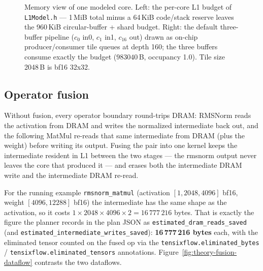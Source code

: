 \begin{figure}[t]
  \caption{Memory view of one modeled core. Left: the per-core L1 budget of
    \texttt{L1Model.h} --- 1\,MiB total minus a 64\,KiB code/stack reserve leaves
    the 960\,KiB circular-buffer + shard budget. Right: the default three-buffer
    pipeline ($c_0$ in0, $c_1$ in1, $c_{16}$ out) drawn as on-chip
    producer/consumer tile queues at depth 160; the three buffers consume exactly
    the budget ($983040$\,B, occupancy 1.0). Tile size 2048\,B is bf16 32x32.}
  \label{fig:theory-core-memory}
\end{figure}

\subsection{Operator fusion}

Without fusion, every operator boundary round-trips DRAM: RMSNorm reads the
activation from DRAM and writes the normalized intermediate back out, and the
following MatMul re-reads that same intermediate from DRAM (plus the weight) before
writing its output. Fusing the pair into one kernel keeps the intermediate resident
in L1 between the two stages --- the rmsnorm output never leaves the core that
produced it --- and erases both the intermediate DRAM write and the intermediate
DRAM re-read.

For the running example \texttt{rmsnorm\_matmul} (activation
$[1, 2048, 4096]$ bf16, weight $[4096, 12288]$ bf16) the intermediate has the same
shape as the activation, so it costs $1 \times 2048 \times 4096 \times 2 =
16\,777\,216$ bytes. That is exactly the figure the planner records in the plan
JSON as \texttt{estimated\_dram\_reads\_saved} (and
\texttt{estimated\_intermediate\_writes\_saved}): \textbf{16\,777\,216 bytes} each,
with the eliminated tensor counted on the fused op via the
\texttt{tensixflow.eliminated\_bytes} / \texttt{tensixflow.eliminated\_tensors}
annotations. Figure~\ref{fig:theory-fusion-dataflow} contrasts the two dataflows.


